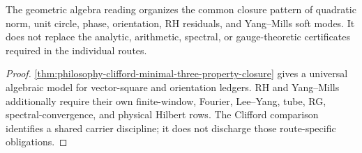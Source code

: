 \begin{corollary}
\label{cor:philosophy-geometric-algebra-not-proof-substitute}
The geometric algebra reading organizes the common closure pattern of
quadratic norm, unit circle, phase, orientation, RH residuals, and
Yang--Mills soft modes. It does not replace the analytic, arithmetic,
spectral, or gauge-theoretic certificates required in the individual
routes.
\end{corollary}
\begin{proof}
\autoref{thm:philosophy-clifford-minimal-three-property-closure} gives a
universal algebraic model for vector-square and orientation ledgers. RH
and Yang--Mills additionally require their own finite-window, Fourier,
Lee--Yang, tube, RG, spectral-convergence, and physical Hilbert rows.
The Clifford comparison identifies a shared carrier discipline; it does
not discharge those route-specific obligations.
\end{proof}
